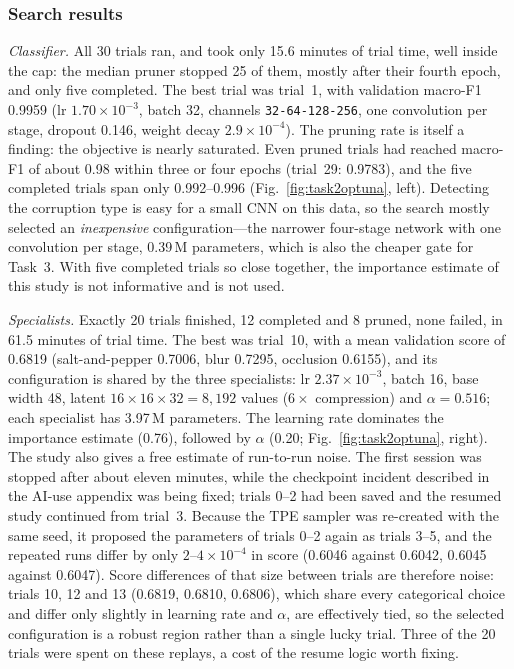 \documentclass[conference]{IEEEtran}
\begin{document}
\subsubsection{Search results}

\emph{Classifier.} All 30 trials ran, and took only 15.6 minutes of trial time,
well inside the cap: the median pruner stopped 25 of them, mostly after their
fourth epoch, and only five completed. The best trial was trial~1, with
validation macro-F1 0.9959 (lr $1.70\times10^{-3}$, batch 32, channels
\texttt{32-64-128-256}, one convolution per stage, dropout 0.146, weight decay
$2.9\times10^{-4}$). The pruning rate is itself a finding: the objective is nearly
saturated. Even pruned trials had reached macro-F1 of about 0.98 within three or
four epochs (trial~29: 0.9783), and the five completed trials span only
0.992--0.996 (Fig.~\ref{fig:task2optuna}, left). Detecting the corruption type is
easy for a small CNN on this data, so the search mostly selected an
\emph{inexpensive} configuration---the narrower four-stage network with one
convolution per stage, 0.39\,M parameters, which is also the cheaper gate for
Task~3. With five completed trials so close together, the importance estimate of
this study is not informative and is not used.

\emph{Specialists.} Exactly 20 trials finished, 12 completed and 8 pruned, none
failed, in 61.5 minutes of trial time. The best was trial~10, with a mean
validation score of 0.6819 (salt-and-pepper 0.7006, blur 0.7295, occlusion
0.6155), and its configuration is shared by the three specialists: lr
$2.37\times10^{-3}$, batch 16, base width 48, latent $16 \times 16 \times 32 = 8{,}192$
values ($6\times$ compression) and $\alpha = 0.516$; each specialist has 3.97\,M
parameters. The learning rate dominates the importance estimate (0.76), followed
by $\alpha$ (0.20; Fig.~\ref{fig:task2optuna}, right). The study also gives a free
estimate of run-to-run noise. The first session was stopped after about eleven
minutes, while the checkpoint incident described in the AI-use appendix was being
fixed; trials 0--2 had been saved and the resumed study continued from trial~3.
Because the TPE sampler was re-created with the same seed, it proposed the
parameters of trials 0--2 again as trials 3--5, and the repeated runs differ by
only $2$--$4\times10^{-4}$ in score (0.6046 against 0.6042, 0.6045 against
0.6047). Score differences of that size between trials are therefore noise:
trials 10, 12 and 13 (0.6819, 0.6810, 0.6806), which share every categorical
choice and differ only slightly in learning rate and $\alpha$, are effectively
tied, so the selected configuration is a robust region rather than a single lucky
trial. Three of the 20 trials were spent on these replays, a cost of the resume
logic worth fixing.
\end{document}

